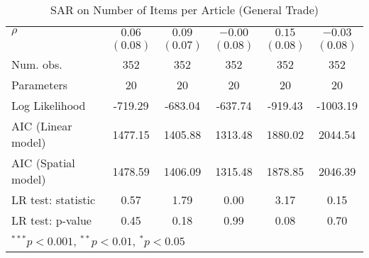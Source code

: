 \begin{table}[!h]
\begin{center}
\begin{tabular}{l c c c c c }
$\rho$                  & $0.06$       & $0.09$        & $-0.00$      & $0.15$       & $-0.03$      \\
                        & $(0.08)$     & $(0.07)$      & $(0.08)$     & $(0.08)$     & $(0.08)$     \\
\midrule
Num. obs.               & 352          & 352           & 352          & 352          & 352          \\
Parameters              & 20           & 20            & 20           & 20           & 20           \\
Log Likelihood          & -719.29      & -683.04       & -637.74      & -919.43      & -1003.19     \\
AIC (Linear model)      & 1477.15      & 1405.88       & 1313.48      & 1880.02      & 2044.54      \\
AIC (Spatial model)     & 1478.59      & 1406.09       & 1315.48      & 1878.85      & 2046.39      \\
LR test: statistic      & 0.57         & 1.79          & 0.00         & 3.17         & 0.15         \\
LR test: p-value        & 0.45         & 0.18          & 0.99         & 0.08         & 0.70         \\
\bottomrule
\multicolumn{6}{l}{\scriptsize{$^{***}p<0.001$, $^{**}p<0.01$, $^*p<0.05$}}
\end{tabular}
\caption{SAR on Number of Items per Article (General Trade)}
\label{table:coefficients}
\end{center}
\end{table}
